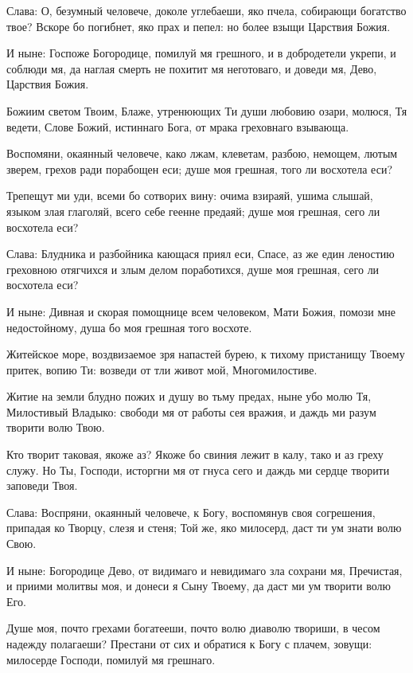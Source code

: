 Слава: О, безумный человече, доколе углебаеши, яко пчела, собирающи богатство твое? Вскоре бо погибнет, яко прах и пепел: но более взыщи Царствия Божия.


И ныне: Госпоже Богородице, помилуй мя грешного, и в добродетели укрепи, и соблюди мя, да наглая смерть не похитит мя неготоваго, и доведи мя, Дево, Царствия Божия.




Божиим светом Твоим, Блаже, утренюющих Ти души любовию озари, молюся, Тя ведети, Слове Божий, истиннаго Бога, от мрака греховнаго взывающа.


Воспомяни, окаянный человече, како лжам, клеветам, разбою, немощем, лютым зверем, грехов ради порабощен еси; душе моя грешная, того ли восхотела еси?


Трепещут ми уди, всеми бо сотворих вину: очима взираяй, ушима слышай, языком злая глаголяй, всего себе геенне предаяй; душе моя грешная, сего ли восхотела еси?


Слава: Блудника и разбойника кающася приял еси, Спасе, аз же един леностию греховною отягчихся и злым делом поработихся, душе моя грешная, сего ли восхотела еси?


И ныне: Дивная и скорая помощнице всем человеком, Мати Божия, помози мне недостойному, душа бо моя грешная того восхоте.




Житейское море, воздвизаемое зря напастей бурею, к тихому пристанищу Твоему притек, вопию Ти: возведи от тли живот мой, Многомилостиве.


Житие на земли блудно пожих и душу во тьму предах, ныне убо молю Тя, Милостивый Владыко: свободи мя от работы сея вражия, и даждь ми разум творити волю Твою.


Кто творит таковая, якоже аз? Якоже бо свиния лежит в калу, тако и аз греху служу. Но Ты, Господи, исторгни мя от гнуса сего и даждь ми сердце творити заповеди Твоя.


Слава: Воспряни, окаянный человече, к Богу, воспомянув своя согрешения, припадая ко Творцу, слезя и стеня; Той же, яко милосерд, даст ти ум знати волю Свою.


И ныне: Богородице Дево, от видимаго и невидимаго зла сохрани мя, Пречистая, и приими молитвы моя, и донеси я Сыну Твоему, да даст ми ум творити волю Его.




Душе моя, почто грехами богатееши, почто волю диаволю твориши, в чесом надежду полагаеши? Престани от сих и обратися к Богу с плачем, зовущи: милосерде Господи, помилуй мя грешнаго.


